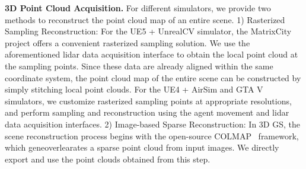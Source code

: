 \textbf{3D Point Cloud Acquisition.} 
For different simulators, we provide two methods to reconstruct the point cloud map of an entire scene. 1) Rasterized Sampling Reconstruction:
For the UE5 + UnrealCV simulator, the MatrixCity~\cite{li2023matrixcity} project offers a convenient rasterized sampling solution. We use the aforementioned lidar data acquisition interface to obtain the local point cloud at the sampling points. Since these data are already aligned within the same coordinate system, the point cloud map of the entire scene can be constructed by simply stitching local point clouds. For the UE4 + AirSim and GTA V simulators, we customize rasterized sampling points at appropriate resolutions, and perform sampling and reconstruction using the agent movement and lidar data acquisition interfaces. 2) Image-based Sparse Reconstruction: In 3D GS, the scene reconstruction process begins with the open-source COLMAP~\cite{colmap} framework, which geneoverlearates a sparse point cloud from input images. We directly export and use the point clouds obtained from this step. 



